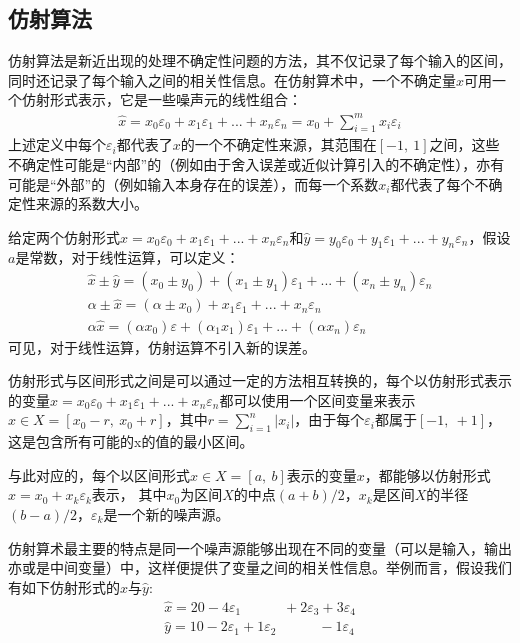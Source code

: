 \subsection{仿射算法}

仿射算法\cite{de2004affine}是新近出现的处理不确定性问题的方法，其不仅记录了每个输入的区间，同时还记录了每个输入之间的相关性信息。在仿射算术中，一个不确定量$x$可用一个仿射形式表示，它是一些噪声元的线性组合：
\begin{align*}
    \hat{x}  = x_0\varepsilon_0 + x_1\varepsilon_1 + ... + x_n\varepsilon_n = x_0 + \sum_{i=1}^{m}x_i\varepsilon_i
\end{align*}
上述定义中每个$\varepsilon_i$都代表了$x$的一个不确定性来源，其范围在$[-1,\ 1]$之间，这些不确定性可能是“内部”的（例如由于舍入误差或近似计算引入的不确定性），亦有可能是“外部”的（例如输入本身存在的误差），而每一个系数$x_i$都代表了每个不确定性来源的系数大小。

给定两个仿射形式$\hat{x}  = x_0\varepsilon_0 + x_1\varepsilon_1 + ... + x_n\varepsilon_n$和$\hat{y}  = y_0\varepsilon_0 + y_1\varepsilon_1 + ... + y_n\varepsilon_n$，假设$a$是常数，对于线性运算，可以定义：
\begin{gather*}
    \hat{x} \pm \hat{y} = (x_0 \pm y_0) + (x_1 \pm y_1)\varepsilon_1 + ... + (x_n \pm y_n)\varepsilon_n \\
    \alpha \pm \hat{x} = (\alpha \pm x_0) + x_1\varepsilon_1 + ... + x_n\varepsilon_n \\
    \alpha \hat{x} = (\alpha x_0)\varepsilon + (\alpha_1 x_1)\varepsilon_1 + ... + (\alpha x_n)\varepsilon_n
\end{gather*}
可见，对于线性运算，仿射运算不引入新的误差。

仿射形式与区间形式之间是可以通过一定的方法相互转换的，每个以仿射形式表示的变量$\hat{x}  = x_0\varepsilon_0 + x_1\varepsilon_1 + ... + x_n\varepsilon_n$都可以使用一个区间变量来表示 $x \in X = [x_0 - r,\ x_0 + r]$，其中$r = \sum_{i=1}^{n} |x_i| $，由于每个$\varepsilon_i$都属于$[-1,\ +1]$，这是包含所有可能的x的值的最小区间。

与此对应的，每个以区间形式$ x \in X = [a,\ b]$表示的变量$x$，都能够以仿射形式$\hat{x} = x_0 + x_k\varepsilon_k$表示， 其中$x_0$为区间$X$的中点$(a+b)/2$，$x_k$是区间$X$的半径$(b-a)/2$，$\varepsilon_k$是一个新的噪声源。

仿射算术最主要的特点是同一个噪声源能够出现在不同的变量（可以是输入，输出亦或是中间变量）中，这样便提供了变量之间的相关性信息。举例而言，假设我们有如下仿射形式的$\hat{x}$与$\hat{y}$:
\begin{align*}
    \hat{x} = 20 - 4\varepsilon_1 \qquad \quad + 2\varepsilon_3 + 3\varepsilon_4 \\
    \hat{y} = 10 - 2\varepsilon_1 + 1\varepsilon_2 \qquad \quad - 1\varepsilon_4
\end{align*}


